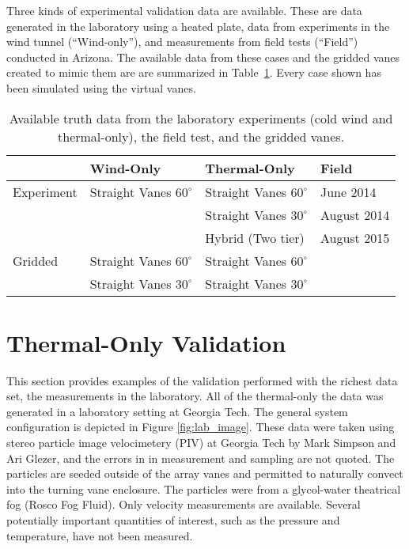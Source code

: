 Three kinds of experimental validation data are available. These are
data generated in the laboratory using a heated plate, data from
experiments in the wind tunnel (``Wind-only''), and measurements from field
tests (``Field'') conducted in Arizona. The available data from
these cases and the gridded vanes created to mimic them are are
summarized in Table~\ref{tab:val_data}. Every case shown has been
simulated using the virtual vanes.   

\begin{table}[h]
\centering
\label{my-label}
\begin{tabular}{l|l|l|l|}
           & Wind-Only                   & Thermal-Only                & Field  \\
  \hline 
Experiment & Straight Vanes $60^{\circ}$ & Straight Vanes $60^{\circ}$ & June 2014   \\
           &                           & Straight Vanes $30^{\circ}$   & August 2014 \\
           &                           & Hybrid (Two tier)             & August 2015 \\
  \hline 
Gridded    & Straight Vanes $60^{\circ}$ & Straight Vanes $60^{\circ}$ & \\
           & Straight Vanes $30^{\circ}$ & Straight Vanes $30^{\circ}$ & \\
  \hline 
\end{tabular}
  \caption{Available truth data from the laboratory experiments 
    (cold wind and thermal-only), the field test, and the gridded vanes.} 
  \label{tab:val_data}
\end{table}
%
%
%
%
%


%
%
\section{Thermal-Only Validation}
This section provides examples of the validation performed with the
richest data set, the measurements in the laboratory. All of the
thermal-only the data was generated in a laboratory setting at Georgia
Tech. The general system configuration is depicted in Figure
\ref{fig:lab_image}. These data were taken using stereo particle image
velocimetery (PIV) at Georgia Tech by Mark Simpson and Ari Glezer, and
the errors in in measurement and sampling are 
not quoted. The particles are seeded outside of the array vanes and
permitted to naturally convect into the turning vane enclosure. The
particles were from a glycol-water theatrical fog (Rosco Fog Fluid). 
Only velocity measurements are available. Several
potentially important quantities of interest, such as the pressure and
temperature, have not been measured.  


